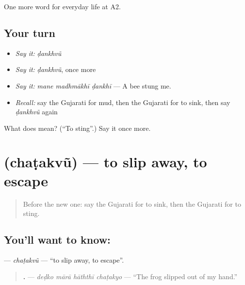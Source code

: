 \begin{grammarlens}[title={What you've built}]
One more word for everyday life at A2.
\end{grammarlens}

\subsection*{Your turn}
\begin{itemize}
\raggedright
  \item \emph{Say it:} \emph{ḍankhvũ}
  \item \emph{Say it:} \emph{ḍankhvũ}, once more
  \item \emph{Say it:} \emph{mane madhmākhī ḍankhī} — A bee stung me.
  \item \emph{Recall:} say the Gujarati for mud, then the Gujarati for to sink, then say \emph{ḍankhvũ} again
\end{itemize}

\begin{tcolorbox}[breakable,colback=teal!4,colframe=teal!35!black,title={Before you move on}]
What does  mean? (\textquotedblleft{}To sting\textquotedblright{}.) Say it once more.
\end{tcolorbox}
\section[\texorpdfstring{\gu{છટકવું} (chaṭakvũ)}{છટકવું (chaṭakvũ)}]{ (chaṭakvũ) — to slip away, to escape}

\label{lesson:GU-C239-chatakvu}



\begin{quote}
Before the new one: say the Gujarati for to sink, then the Gujarati for to sting.
\end{quote}

\subsection*{You'll want to know: }
\textbf{} — \emph{chaṭakvũ} — \textquotedblleft{}to slip away, to escape\textquotedblright{}.

\begin{quote}
\textbf{   .} — \emph{deḍko mārā hāththī chaṭakyo} — \textquotedblleft{}The frog slipped out of my hand.\textquotedblright{}
\end{quote}

